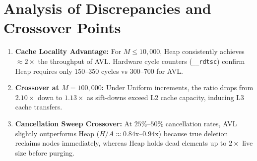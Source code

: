 \documentclass[11pt,a4paper]{article}
\begin{document}
\section{Analysis of Discrepancies and Crossover Points}
\begin{enumerate}
    \item \textbf{Cache Locality Advantage:} For $M \le 10{,}000$, Heap consistently achieves $\approx 2\times$ the throughput of AVL. Hardware cycle counters (\texttt{\_\_rdtsc}) confirm Heap requires only $150$--$350$ cycles vs $300$--$700$ for AVL.
    \item \textbf{Crossover at $M = 100{,}000$:} Under Uniform increments, the ratio drops from $2.10\times$ down to $1.13\times$ as sift-downs exceed L2 cache capacity, inducing L3 cache transfers.
    \item \textbf{Cancellation Sweep Crossover:} At $25\%$--$50\%$ cancellation rates, AVL slightly outperforms Heap ($H/A \approx 0.84\text{x}$--$0.94\text{x}$) because true deletion reclaims nodes immediately, whereas Heap holds dead elements up to $2\times$ live size before purging.
\end{enumerate}
\end{document}
